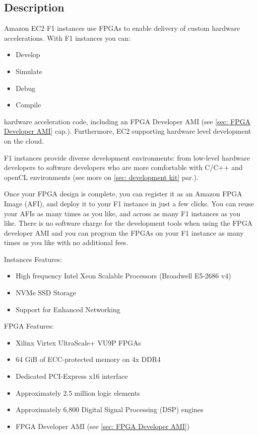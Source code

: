 \documentclass[a4paper]{article}
\begin{document}
    \subsection{Description}

    Amazon EC2 F1 instances use FPGAs to enable delivery of custom hardware accelerations. With F1 instances you can:
    \begin{itemize}
        \item Develop
        \item Simulate
        \item Debug
        \item Compile
    \end{itemize}
    hardware acceleration code, including an FPGA Developer AMI (see \ref{sec: FPGA Developer AMI} cap.). Furthermore, EC2 supporting hardware level development on the cloud.\newline

    \noindent
    F1 instances provide diverse development environments: from low-level hardware developers to software developers who are more comfortable with C/C++ and openCL environments (see more on \ref{sec: development kit} par.).\newline

    \noindent
    Once your FPGA design is complete, you can register it as an Amazon FPGA Image (AFI), and deploy it to your F1 instance in just a few clicks. You can reuse your AFIs as many times as you like, and across as many F1 instances as you like. There is no software charge for the development tools when using the FPGA developer AMI and you can program the FPGAs on your F1 instance as many times as you like with no additional fees.\newline

    \noindent
    Instances Features:
    \begin{itemize}
        \item High frequency Intel Xeon Scalable Processors (Broadwell E5-2686 v4)
        \item NVMe SSD Storage
        \item Support for Enhanced Networking
    \end{itemize}
    FPGA Features:
    \begin{itemize}
        \item Xilinx Virtex UltraScale+ VU9P FPGAs
        \item 64 GiB of ECC-protected memory on 4x DDR4
        \item Dedicated PCI-Express x16 interface
        \item Approximately 2.5 million logic elements
        \item Approximately 6,800 Digital Signal Processing (DSP) engines
        \item FPGA Developer AMI (see \ref{sec: FPGA Developer AMI})
    \end{itemize}\newpage
\end{document}
